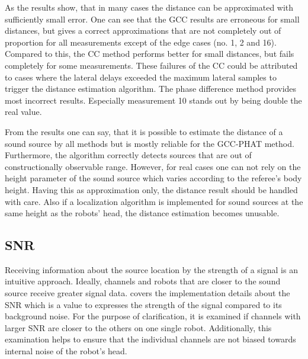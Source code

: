As the results show, that in many cases the distance can be approximated with
sufficiently small error.
One can see that the \ac{GCC} results are erroneous for small
distances, but gives a correct approximations that are not completely out of proportion
for all measurements except of the edge cases (no. 1, 2 and 16).
Compared to this, the \ac{CC} method performs better for small distances,
but fails completely for some measurements.
These failures of the \ac{CC} could be attributed to cases where the
lateral delays exceeded the maximum lateral samples to trigger the
distance estimation algorithm.
The phase difference method provides most incorrect results.
Especially measurement 10 stands out by being double the real value.


From the results one can say, that it is possible to estimate the distance
of a sound source by all methods but is mostly reliable for the \ac{GCC-PHAT} method.
Furthermore, the algorithm correctly detects sources that are out of
constructionally observable range.
However, for real cases one can not rely on the height parameter of the sound
source which varies according to the referee's body height.
Having this as approximation only, the distance result should be handled
with care.
Also if a localization algorithm is implemented for sound sources
at the same height as the robots' head, the distance estimation becomes unusable.

\subsection{SNR}
\label{subsec:04_snr}

Receiving information about the source location by the strength of a signal
is an intuitive approach.
Ideally, channels and robots that are closer to the sound source
receive greater signal data.
 covers the implementation details about the \ac{SNR} which
is a value to expresses the strength of the signal compared to its background noise.
For the purpose of clarification, it is examined if channels
with larger \ac{SNR} are closer to the others on one single robot.
Additionally, this examination helps to ensure that the individual channels
are not biased towards internal noise of the robot's head.

